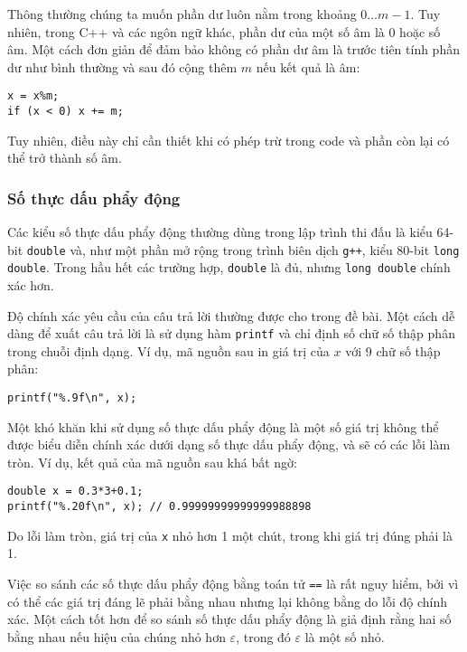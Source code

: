 Thông thường chúng ta muốn phần dư luôn
nằm trong khoảng $0\ldots m-1$.
Tuy nhiên, trong C++ và các ngôn ngữ khác,
phần dư của một số âm
là 0 hoặc số âm.
Một cách đơn giản để đảm bảo không có
phần dư âm là trước tiên tính
phần dư như bình thường và sau đó cộng thêm $m$
nếu kết quả là âm:
\begin{lstlisting}
x = x%m;
if (x < 0) x += m;
\end{lstlisting}
Tuy nhiên, điều này chỉ cần thiết khi có
phép trừ trong code và
phần còn lại có thể trở thành số âm.

\subsubsection{Số thực dấu phẩy động}


Các kiểu số thực dấu phẩy động thường dùng trong
lập trình thi đấu là
kiểu 64-bit \texttt{double}
và, như một phần mở rộng trong trình biên dịch \texttt{g++},
kiểu 80-bit \texttt{long double}.
Trong hầu hết các trường hợp, \texttt{double} là đủ,
nhưng \texttt{long double} chính xác hơn.

Độ chính xác yêu cầu của câu trả lời
thường được cho trong đề bài.
Một cách dễ dàng để xuất câu trả lời là sử dụng
hàm \texttt{printf}
và chỉ định số chữ số thập phân
trong chuỗi định dạng.
Ví dụ, mã nguồn sau in
giá trị của $x$ với 9 chữ số thập phân:

\begin{lstlisting}
printf("%.9f\n", x);
\end{lstlisting}

Một khó khăn khi sử dụng số thực dấu phẩy động
là một số giá trị không thể được biểu diễn
chính xác dưới dạng số thực dấu phẩy động,
và sẽ có các lỗi làm tròn.
Ví dụ, kết quả của mã nguồn sau
khá bất ngờ:

\begin{lstlisting}
double x = 0.3*3+0.1;
printf("%.20f\n", x); // 0.99999999999999988898
\end{lstlisting}

Do lỗi làm tròn,
giá trị của \texttt{x} nhỏ hơn 1 một chút,
trong khi giá trị đúng phải là 1.

Việc so sánh các số thực dấu phẩy động
bằng toán tử \texttt{==} là rất nguy hiểm,
bởi vì có thể các giá trị đáng lẽ phải
bằng nhau nhưng lại không bằng do lỗi độ chính xác.
Một cách tốt hơn để so sánh số thực dấu phẩy động
là giả định rằng hai số bằng nhau
nếu hiệu của chúng nhỏ hơn $\varepsilon$,
trong đó $\varepsilon$ là một số nhỏ.

